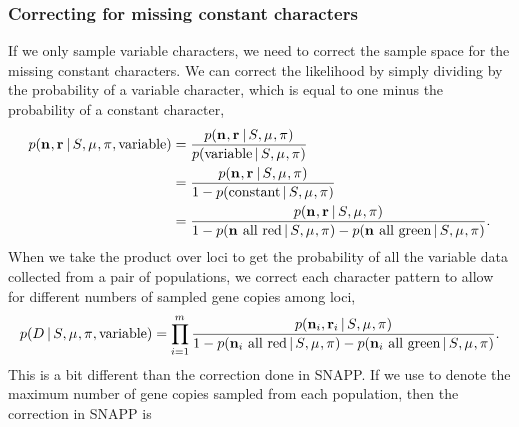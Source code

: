 \subsubsection{Correcting for missing constant characters}

If we only sample variable characters, we need to correct the sample space for
the missing constant characters.
We can correct the likelihood by simply dividing by the probability of a
variable character, which is equal to one minus the probability of a constant
character,
\begin{equation}
\begin{split}
    \pr(\leafallelecounts, \leafredallelecounts \given \sptree, \murate, \gfreq, \textrm{variable})
    & =
    \frac{
        \pr(\leafallelecounts, \leafredallelecounts \given \sptree, \murate, \gfreq)
    }{
        \pr(\textrm{variable} \given \sptree, \murate, \gfreq)
    } \\
    & =
    \frac{
        \pr(\leafallelecounts, \leafredallelecounts \given \sptree, \murate, \gfreq)
    }{
        1 - \pr(\textrm{constant} \given \sptree, \murate, \gfreq)
    } \\
    & =
    \frac{
        \pr(\leafallelecounts, \leafredallelecounts \given \sptree, \murate, \gfreq)
    }{
        1 - \pr(\leafallelecounts \textrm{ all red} \given \sptree, \murate, \gfreq)
        - \pr(\leafallelecounts \textrm{ all green} \given \sptree, \murate, \gfreq)
    }.
    \label{eq:variablemarkerlikelihood}
\end{split}
\end{equation}
When we take the product over loci to get the probability of all the variable
data collected from a pair of populations, we correct each character pattern to
allow for different numbers of sampled gene copies among loci,
\begin{equation}
    \pr(\comparisondata \given \sptree, \murate, \gfreq, \textrm{variable})
    =
    \prod_{i=1}^{\nloci}
    \frac{
        \pr(\leafallelecounts[i], \leafredallelecounts[i] \given \sptree, \murate, \gfreq)
    }{
        1 - \pr(\leafallelecounts[i] \textrm{ all red} \given \sptree, \murate, \gfreq)
        - \pr(\leafallelecounts[i] \textrm{ all green} \given \sptree, \murate, \gfreq)
    }.
    \label{eq:variablecomparisonlikelihood}
\end{equation}
This is a bit different than the correction done in SNAPP.
If we use \maxleafallelecounts to denote the maximum number of gene copies
sampled from each population, then the correction in SNAPP is
